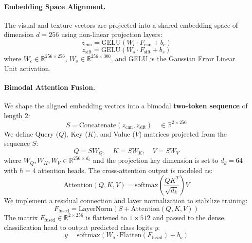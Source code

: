 \documentclass[12pt, a4paper]{article}
\begin{document}
\paragraph{Embedding Space Alignment.} The visual and texture vectors are projected into a shared embedding space of dimension $d = 256$ using non-linear projection layers:
\begin{equation}
z_{\text{cnn}} = \text{GELU}(W_c \cdot F_{\text{cnn}} + b_c)
\end{equation}
\begin{equation}
z_{\text{sift}} = \text{GELU}(W_s \cdot F_{\text{sift}} + b_s)
\end{equation}
where $W_c \in \mathbb{R}^{256 \times 256}$, $W_s \in \mathbb{R}^{256 \times 300}$, and GELU is the Gaussian Error Linear Unit activation.

\paragraph{Bimodal Attention Fusion.} We shape the aligned embedding vectors into a bimodal \textbf{two-token sequence} of length 2:
\begin{equation}
S = \text{Concatenate}(z_{\text{cnn}}, z_{\text{sift}}) \quad \in \mathbb{R}^{2 \times 256}
\end{equation}
We define Query ($Q$), Key ($K$), and Value ($V$) matrices projected from the sequence $S$:
\begin{equation}
Q = S W_Q, \quad K = S W_K, \quad V = S W_V
\end{equation}
where $W_Q, W_K, W_V \in \mathbb{R}^{256 \times d_k}$ and the projection key dimension is set to $d_k = 64$ with $h = 4$ attention heads. The cross-attention output is modeled as:
\begin{equation}
\text{Attention}(Q, K, V) = \text{softmax}\left(\frac{Q K^T}{\sqrt{d_k}}\right) V
\end{equation}
We implement a residual connection and layer normalization to stabilize training:
\begin{equation}
F_{\text{fused}} = \text{LayerNorm}(S + \text{Attention}(Q, K, V))
\end{equation}
The matrix $F_{\text{fused}} \in \mathbb{R}^{2 \times 256}$ is flattened to $1 \times 512$ and passed to the dense classification head to output predicted class logits $y$:
\begin{equation}
y = \text{softmax}(W_o \cdot \text{Flatten}(F_{\text{fused}}) + b_o)
\end{equation}
\end{document}
